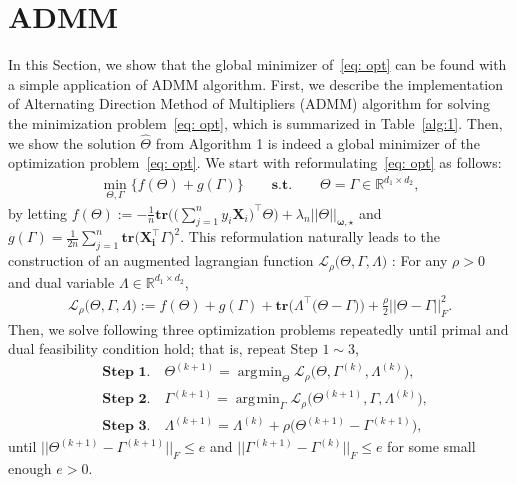 \documentclass[12pt]{article}
\DeclareMathOperator*{\argmin}{\arg\!\min}
\begin{document}
\section{ADMM}
In this Section, we show that the global minimizer of~\eqref{eq: opt} can be found with a simple application of ADMM algorithm. 
First, we describe the implementation of Alternating Direction Method of Multipliers (ADMM) algorithm for solving the minimization problem~\eqref{eq: opt}, which is summarized in Table~\eqref{alg:1}.
Then, we show the solution $\widehat{\Theta}$ from Algorithm 1 is indeed a global minimizer of the optimization problem~\eqref{eq: opt}.
We start with reformulating~\eqref{eq: opt} as follows:
\begin{align*}
    \min_{\Theta, \Gamma} \bigg\{ f(\Theta) + g(\Gamma) \bigg\}
    \qquad \textbf{s.t.} \qquad \Theta = \Gamma \in \mathbb{R}^{d_{1}\times d_{2}},
\end{align*}
by letting $f(\Theta):=-\frac{1}{n}\textbf{tr}\big( \big(\sum_{j=1}^{n}y_{i}\mathbf{X}_{i}\big)^{\top}\Theta \big)+\lambda_{n}||\Theta||_{\boldsymbol{\omega,\star}}$ and $g(\Gamma)=\frac{1}{2n}\sum_{j=1}^{n}\textbf{tr}\big(\mathbf{X_i^\top}\Gamma\big)^{2}$.
This reformulation naturally leads to the construction of an augmented lagrangian function $\mathcal{L}_{\rho}\big(\Theta,\Gamma,\Lambda\big)$ : For any $\rho>0$ and dual variable $\Lambda \in \mathbb{R}^{d_{1}\times d_{2}}$, 
\begin{align*}
    \mathcal{L}_{\rho}\big(\Theta,\Gamma,\Lambda\big):=
    f(\Theta) + g(\Gamma) + \textbf{tr}\big( \Lambda^{\top}\big( \Theta-\Gamma \big)\big)
    + \frac{\rho}{2} || \Theta-\Gamma ||_{F}^{2}.
\end{align*}
Then, we solve following three optimization problems repeatedly until primal and dual feasibility condition hold; that is, 
repeat Step $1 \sim 3$,
\begin{align*}
    &\textbf{Step 1.} \quad \Theta^{(k+1)} = \argmin_{\Theta} \mathcal{L}_{\rho} \big( \Theta,\Gamma^{(k)},\Lambda^{(k)} \big), \\
    &\textbf{Step 2.} \quad \Gamma^{(k+1)} = \argmin_{\Gamma} \mathcal{L}_{\rho} \big( \Theta^{(k+1)},\Gamma,\Lambda^{(k)} \big),  \\
    &\textbf{Step 3.} \quad \Lambda^{(k+1)} = \Lambda^{(k)} + \rho\big( \Theta^{(k+1)}-\Gamma^{(k+1)} \big),
\end{align*}
until $|| \Theta^{(k+1)}-\Gamma^{(k+1)} ||_{F}\leq e$ and $|| \Gamma^{(k+1)}-\Gamma^{(k)} ||_{F}\leq e$ for some small enough $e>0$.
\end{document}
